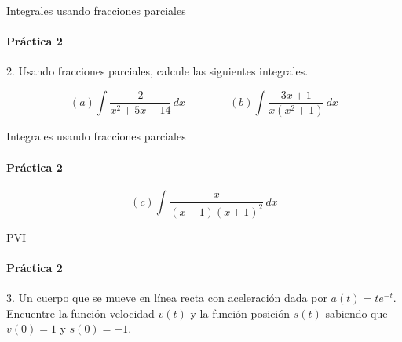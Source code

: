 \documentclass{plantillaPPT}
\begin{document}
\begin{frame}{Integrales usando fracciones parciales}
\framesubtitle{Práctica 2}

2. Usando fracciones parciales, calcule las siguientes integrales.

\[(a) \int \frac{2}{x^2+5x-14}\,dx \qquad \qquad (b) \int \frac{3x+1}{x(x^2+1)}\,dx\]
    
\end{frame}

\begin{frame}{Integrales usando fracciones parciales}
\framesubtitle{Práctica 2}

\[(c) \int \frac{x}{(x-1)(x+1)^2}\,dx\]
    
\end{frame}

\begin{frame}{PVI}
\framesubtitle{Práctica 2}

3. Un cuerpo que se mueve en línea recta con aceleración dada por \(a(t)=te^{-t}\). Encuentre la función velocidad \(v(t)\) y la función posición \(s(t)\) sabiendo que \(v(0)=1\) y \(s(0)=-1\).
    
\end{frame}
\end{document}
